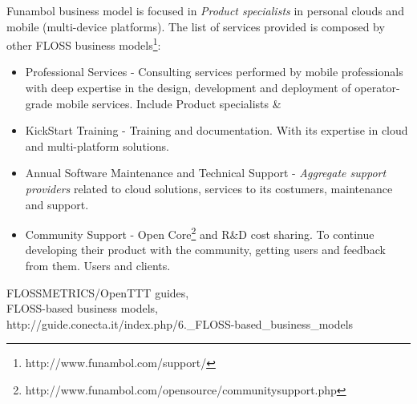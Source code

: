\documentclass[11pt]{scrartcl}
\begin{document}
\par Funambol business model is focused in \emph{Product specialists} in personal clouds and mobile (multi-device platforms). The list of services provided is composed by other FLOSS business models\footnote{http://www.funambol.com/support/}:

\begin{itemize}
	\item Professional Services - Consulting services performed by mobile professionals with deep expertise in the design, development and deployment of operator-grade mobile services. Include Product specialists \& 
	\item KickStart Training - Training and documentation. With its expertise in cloud and multi-platform solutions.
	\item Annual Software Maintenance and Technical Support - \emph{Aggregate support providers} related to cloud solutions, services to its costumers, maintenance and support.
	\item Community Support - Open Core\footnote{http://www.funambol.com/opensource/communitysupport.php} and R\&D cost sharing. To continue developing their product with the community, getting users and feedback from them. Users and clients.
\end{itemize}

\begin{thebibliography}{9}

    FLOSSMETRICS/OpenTTT guides,\\
    FLOSS-based business models,\\
    http://guide.conecta.it/index.php/6.\_FLOSS-based\_business\_models
    
\end{thebibliography}
\end{document}
